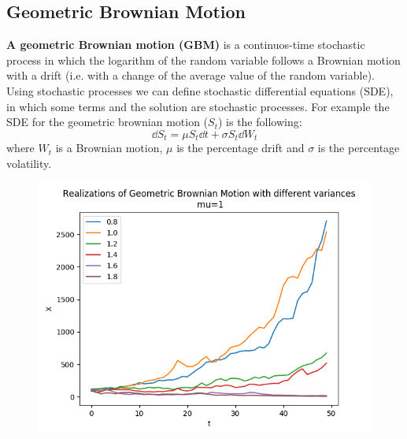 \subsection{Geometric Brownian Motion}

\textbf{A geometric Brownian motion (GBM)} is a continuos-time stochastic process in which the logarithm of the random variable follows a Brownian motion with a drift (i.e. with a change of the average value of the random variable). \\
Using stochastic processes we can define stochastic differential equations (SDE), in which some terms and the solution are stochastic processes.
For example the SDE for the geometric brownian motion ($S_{t}$) is the following:
\begin{equation*}
    \dd S_{t} = \mu S_{t} \dd t + \sigma S_{t} \dd W_{t}
\end{equation*}
where $W_{t}$ is a Brownian motion, $\mu$ is the percentage drift and $\sigma$ is the percentage volatility.

\begin{figure} [H]
    \centering
    \includegraphics[width=0.75\linewidth]{img/GBM.png}
\end{figure}

